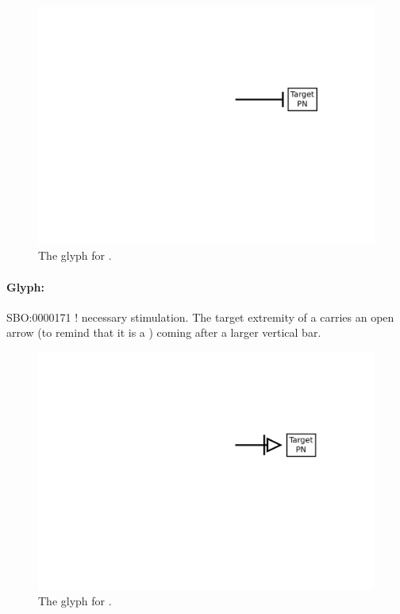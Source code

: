 \begin{figure}[H]
  \centering
  \includegraphics[scale = 0.5]{images/inhibition}
  \caption{The \PD glyph for .}
  \label{fig:inhibition}
\end{figure}


\paragraph{Glyph: }\label{sec:necessary_stim}


\begin{glyphDescription}
 \glyphSboTerm SBO:0000171 ! necessary stimulation.
 \glyphNode The target extremity of a  carries an open arrow (to remind that it is a ) coming after a larger vertical bar.
 \end{glyphDescription}

\begin{figure}[H]
  \centering
  \includegraphics[scale = 0.5]{images/necessary_stim}
  \caption{The \PD glyph for .}
  \label{fig:Necessary Stimulation}
\end{figure}

